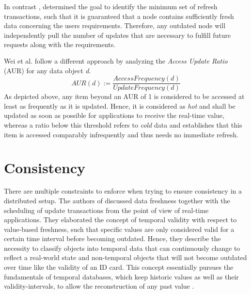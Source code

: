 In contrast \cite{peralta:2006}, determined the goal to identify the minimum set of refresh transactions, such that it is guaranteed that a node contains 
sufficiently fresh data concerning the users requirements. Therefore, any outdated node will independently pull the number of updates that are necessary to 
fulfill future requests along with the requirements.

Wei et al. \cite{wei:2004} follow a different approach by analyzing the \emph{Access Update Ratio} (AUR) for any data object \textit{d}. 
\begin{equation}
AUR(d) := \frac{AccessFrequency(d)}{UpdateFrequency(d)}
\end{equation}
As depicted above, any item beyond an AUR of 1 is considered to be accessed at least as frequently as it is updated.
Hence, it is considered as \emph{hot} and shall be updated as soon as possible for applications to receive the real-time value, 
whereas a ratio below this threshold refers to \emph{cold} data and establishes that this item is accessed comparably infrequently and thus needs no immediate refresh. 






\section{Consistency}
\label{sec:consistency}
There are multiple constraints to enforce when trying to ensure consistency in a distributed setup.
The authors of \cite{wei:2004, xiang:2008} discussed data freshness together with the scheduling of update transactions from the 
point of view of real-time applications. They elaborated the concept of temporal validity with respect to value-based freshness,
such that specific values are only considered valid for a certain time interval before becoming outdated. Hence, they describe the necessity to classify objects into
temporal data that can continuously change to reflect a real-world state and non-temporal objects that will not become outdated over time like the validity of an ID card.
This concept essentially pursues the fundamentals of temporal databases, which keep historic values as well as their validity-intervals, to allow the reconstruction of any 
past value \cite{etzion:1998}. 

